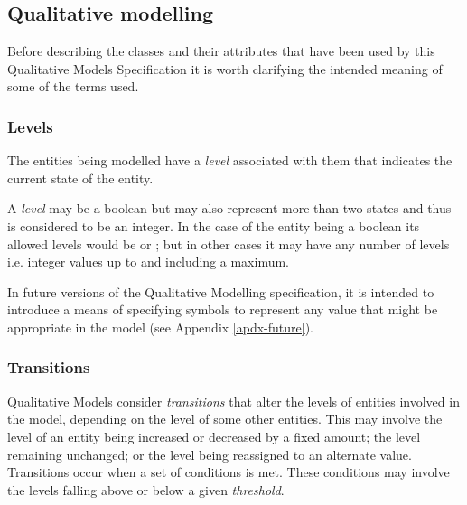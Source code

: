 \pagebreak
\subsection{Qualitative modelling}
\label{qual}

Before describing the classes and their attributes that have been used by this Qualitative Models Specification it is worth clarifying the intended meaning of some of the terms used. 

\subsubsection{Levels}


The entities being modelled have a \emph{level} associated with them that indicates the current state of the entity. 

A \emph{level} may be a boolean but may also represent more than two states and thus is considered to be an integer. In the case of the entity being a boolean its allowed levels would be  or ; but in other cases it may have any number of levels i.e. integer values up to and including a maximum. 

In future versions of the Qualitative Modelling specification, it is intended to introduce a means of specifying symbols to represent any value that might be appropriate in the model (see Appendix \ref{apdx-future}).

\smallskip

\subsubsection{Transitions}

Qualitative Models consider \emph{transitions} that alter the levels of entities involved in the model, depending on the level of some other entities.  This may involve the level of an entity being increased or decreased by a fixed amount; the level remaining unchanged; or the level being reassigned to an alternate value. Transitions occur when a set of conditions is met. These conditions may involve the levels falling above or below  a given \emph{threshold}. 

